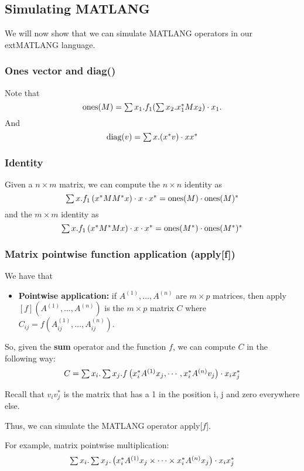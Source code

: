 \subsection{Simulating MATLANG}

We will now show that we can simulate MATLANG operators in our extMATLANG language.

\subsubsection{Ones vector and diag()}

Note that $$\text{ones}(M)=\textstyle\sum x_1. f_1(\textstyle\sum x_2. x_1^*Mx_2)\cdot x_1.$$ And $$\text{diag}(v)=\textstyle\sum x. (x^*v)\cdot xx^*$$

\subsubsection{Identity}

Given a $n\times m$ matrix, we can compute the $n\times n$ identity as $$\textstyle\sum x. f_1\left(x^*MM^*x\right)\cdot x \cdot x^* = \text{ones}(M)\cdot\text{ones}(M)^*$$ and the $m\times m$ identity as $$\textstyle\sum x. f_1\left(x^*M^*Mx\right)\cdot x \cdot x^*= \text{ones}(M^*)\cdot\text{ones}(M^*)^*$$

\subsubsection{Matrix pointwise function application (apply[f])}

We have that 

\begin{itemize}
	\item \textbf{Pointwise application:} if $A^{(1)}, \ldots, A^{(n)}$ are $m\times p$ matrices, then apply$\left[ f \right](A^{(1)}, \ldots, A^{(n)})$ is the $m\times p$ matrix $C$ where $C_{ij}=f(A^{(1)}_{ij}, \ldots, A^{(n)}_{ij})$.
\end{itemize}

So, given the \textbf{sum} operator and the function $f$, we can compute $C$ in the following way: $$C=\textstyle\sum x_i.\textstyle\sum x_j. f\left( x_i^*A^{(1)}x_j, \cdots, x_i^*A^{(n)}v_j\right)\cdot x_ix_j^*$$

Recall that $v_iv_j^*$ is the matrix that has a 1 in the position i, j and zero everywhere else.

Thus, we can simulate the MATLANG operator apply[$f$].

For example, matrix pointwise multiplication: $$\textstyle\sum x_i.\textstyle\sum x_j.\left( x_i^*A^{(1)}x_j\times \cdots\times x_i^*A^{(n)}x_j\right)\cdot x_ix_j^*$$

